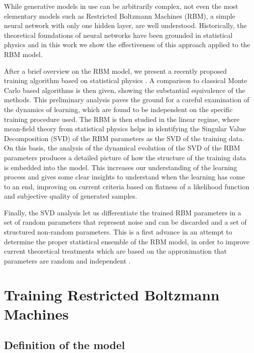 \documentclass{revtex4-1}
\begin{document}
While generative models in use can be arbitrarily complex, not even the most elementary models such as Restricted Boltzmann Machines (RBM), a simple neural network with only one hidden layer, are well understood. Historically, the theoretical foundations of neural networks have been grounded in statistical physics \cite{}\cite{}\cite{} and in this work we show the effectiveness of this approach applied to the RBM model.

After a brief overview on the RBM model, we present a recently proposed training algorithm based on statistical physics \cite{tap_train}\cite{}. A comparison to classical Monte Carlo based algorithms is then given, showing the substantial equivalence of the methods. This preliminary analysis paves the ground for a careful examination of the dynamics of learning, which are found to be independent on the specific training procedure used. The RBM is then studied in the linear regime, where mean-field theory from statistical physics helps in identifying the Singular Value Decomposition (SVD) of the RBM parameters as the SVD of the training data.
On this basis, the analysis of the dynamical evolution of the SVD of the RBM parameters produces a detailed picture of how the structure of the training data is embedded into the model. This increases our understanding of the learning process and gives some clear insights to understand when the learning has come to an end, improving on current criteria based on flatness of a likelihood function and subjective quality of generated samples.

Finally, the SVD analysis let us differentiate the trained RBM parameters in a set of random parameters that represent noise and can be discarded and a set of structured non-random parameters. This is a first advance in an attempt to determine the proper statistical ensemble of the RBM model, in order to improve current theoretical treatments which are based on the approximation that parameters are random and independent \cite{monasson}.

\section{Training Restricted Boltzmann Machines} \label{training}

\subsection{Definition of the model}
\end{document}
